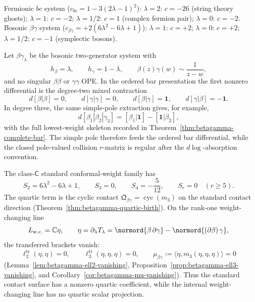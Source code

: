 \begin{computation}
\label{comp:beta-gamma-central-charges}
\label{thm:beta-gamma-ope-complete}
Fermionic $bc$ system ($c_{bc} = 1 - 3(2\lambda-1)^2$):
$\lambda = 2$: $c = -26$ (string theory ghosts);
$\lambda = 1$: $c = -2$;
$\lambda = 1/2$: $c = 1$ (complex fermion pair);
$\lambda = 0$: $c = -2$.
Bosonic $\beta\gamma$ system ($c_{\beta\gamma} = +2(6\lambda^2 - 6\lambda + 1)$):
$\lambda = 1$: $c = +2$;
$\lambda = 0$: $c = +2$;
$\lambda = 1/2$: $c = -1$ (symplectic bosons).
\end{computation}

\begin{proposition}
\label{prop:betagamma-standard-family-ledger}
Let \(\beta\gamma_\lambda\) be the bosonic two-generator system with
\[
h_\beta=\lambda,\qquad h_\gamma=1-\lambda,\qquad
\beta(z)\gamma(w)\sim\frac1{z-w},
\]
and no singular \(\beta\beta\) or \(\gamma\gamma\) OPE.  In the
ordered bar presentation the first nonzero differential is the
degree-two mixed contraction
\begin{equation}\label{eq:betagamma-ledger-bar-d2}
d[\beta|\beta]=0,\qquad d[\gamma|\gamma]=0,\qquad
d[\beta|\gamma]=\mathbf 1,\qquad d[\gamma|\beta]=-\mathbf 1 .
\end{equation}
In degree three, the same simple-pole extraction gives, for example,
\begin{equation}\label{eq:betagamma-ledger-bar-d3}
d[\beta_1|\beta_2|\gamma_3]
=[\beta_1|\mathbf 1]-[\mathbf 1|\beta_2],
\end{equation}
with the full lowest-weight skeleton recorded in
Theorem~\ref{thm:betagamma-complete-bar}.  The simple pole therefore
feeds the ordered bar differential, while the closed pole-valued
collision \(r\)-matrix is regular after the \(d\log\)-absorption
convention.

The class-\(\mathsf C\) standard conformal-weight family has
\begin{equation}\label{eq:betagamma-ledger-shadow}
S_2=6\lambda^2-6\lambda+1,\qquad
S_3=0,\qquad
S_4=-\frac{5}{12},\qquad
S_r=0\quad(r\ge5).
\end{equation}
The quartic term is the cyclic contact
\(\mathfrak Q_{\beta\gamma}=\operatorname{cyc}(m_3)\) on the
standard contact direction
\textup{(}Theorem~\ref{thm:betagamma-quartic-birth}\textup{)}.  On the
rank-one weight-changing line
\[
L_{\mathrm{w.c.}}=\mathbb C\eta,\qquad
\eta=\partial_\lambda T_\lambda
=\normord{\beta\,\partial\gamma}
-\normord{(\partial\beta)\,\gamma},
\]
the transferred brackets vanish:
\[
\ell_2^{\mathrm{tr}}(\eta,\eta)=0,\qquad
\ell_3^{\mathrm{tr}}(\eta,\eta,\eta)=0,\qquad
\mu_{\beta\gamma}:=\langle\eta,m_3(\eta,\eta,\eta)\rangle=0
\]
\textup{(}Lemma~\ref{lem:betagamma-ell2-vanishing},
Proposition~\ref{prop:betagamma-ell3-vanishing}, and
Corollary~\ref{cor:betagamma-mu-vanishing}\textup{)}.  Thus the
standard contact surface has a nonzero quartic coefficient, while the
internal weight-changing line has no quartic scalar projection.


\end{proposition}
